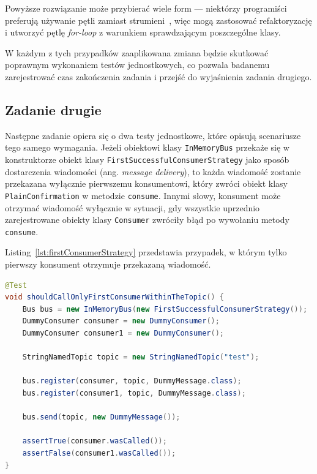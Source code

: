 Powyższe rozwiązanie może przybierać wiele form --- niektórzy programiści preferują używanie pętli zamiast
strumieni~\cite{mazinanian2017understanding}, więc mogą zastosować refaktoryzację i utworzyć pętlę \textit{for-loop}
z warunkiem sprawdzającym poszczególne klasy.

W każdym z tych przypadków zaaplikowana zmiana będzie skutkować poprawnym wykonaniem testów jednostkowych, co
pozwala badanemu zarejestrować czas zakończenia zadania i przejść do wyjaśnienia zadania drugiego.

\subsection{Zadanie drugie}

Następne zadanie opiera się o dwa testy jednostkowe, które opisują scenariusze tego samego wymagania.
Jeżeli obiektowi klasy \texttt{InMemoryBus} przekaże się w konstruktorze obiekt klasy
\texttt{FirstSuccessfulConsumerStrategy} jako sposób dostarczenia wiadomości (ang. \textit{message delivery}),
to każda wiadomość zostanie przekazana wyłącznie pierwszemu konsumentowi, który zwróci obiekt klasy
\texttt{PlainConfirmation} w metodzie \texttt{consume}.
Innymi słowy, konsument może otrzymać wiadomość wyłącznie w sytuacji, gdy wszystkie uprzednio zarejestrowane
obiekty klasy \texttt{Consumer} zwróciły błąd po wywołaniu metody \texttt{consume}.

Listing~\ref{lst:firstConsumerStrategy} przedstawia przypadek, w którym tylko pierwszy konsument otrzymuje
przekazaną wiadomość.

\begin{lstlisting}[language=Java,
    caption={Pierwszy test zadania drugiego --- poinformowany może być tylko pierwszy konsument},
    label={lst:firstConsumerStrategy}]
@Test
void shouldCallOnlyFirstConsumerWithinTheTopic() {
    Bus bus = new InMemoryBus(new FirstSuccessfulConsumerStrategy());
    DummyConsumer consumer = new DummyConsumer();
    DummyConsumer consumer1 = new DummyConsumer();

    StringNamedTopic topic = new StringNamedTopic("test");

    bus.register(consumer, topic, DummyMessage.class);
    bus.register(consumer1, topic, DummyMessage.class);

    bus.send(topic, new DummyMessage());

    assertTrue(consumer.wasCalled());
    assertFalse(consumer1.wasCalled());
}
\end{lstlisting}

